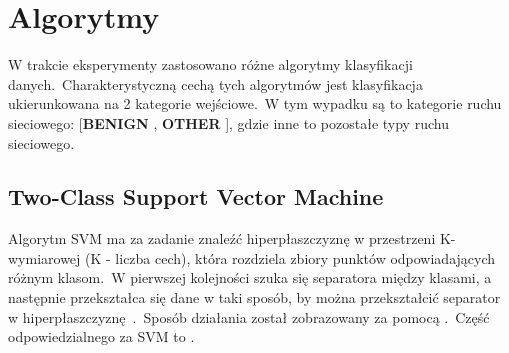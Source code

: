 \section{Algorytmy}
\label{sec:alg}
W trakcie eksperymenty zastosowano różne algorytmy klasyfikacji danych.\ Charakterystyczną cechą tych algorytmów jest klasyfikacja ukierunkowana na 2 kategorie wejściowe.\ W tym wypadku są to kategorie ruchu sieciowego: [\textbf{BENIGN} , \textbf{OTHER} ], gdzie inne to pozostałe typy ruchu sieciowego.

\subsection{Two-Class Support Vector Machine}
Algorytm SVM ma za zadanie znaleźć hiperpłaszczyznę w przestrzeni K-wymiarowej (K - liczba cech), która rozdziela zbiory punktów odpowiadających różnym klasom.\ W pierwszej kolejności szuka się separatora między klasami, a następnie przekształca się dane w taki sposób, by można przekształcić separator w hiperpłaszczyznę~\cite{IBM}.\ Sposób działania został zobrazowany za pomocą .\ Część  odpowiedzialnego za SVM to .

